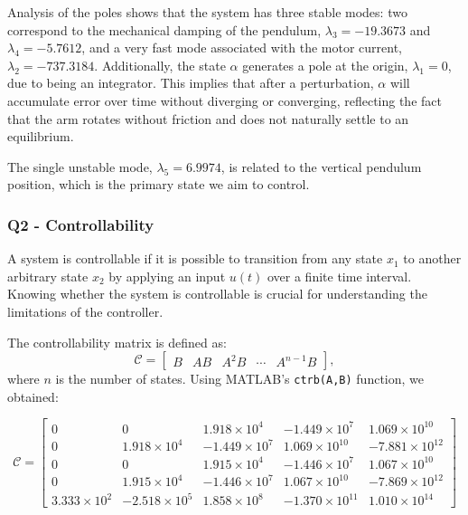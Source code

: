 \par Analysis of the poles shows that the system has three stable modes: two correspond to the mechanical damping of the pendulum, $\lambda_3 = -19.3673$ and $\lambda_4 = -5.7612$, and a very fast mode associated with the motor current, $\lambda_2 = -737.3184$. Additionally, the state $\alpha$ generates a pole at the origin, $\lambda_1 = 0$, due to being an integrator. This implies that after a perturbation, $\alpha$ will accumulate error over time without diverging or converging, reflecting the fact that the arm rotates without friction and does not naturally settle to an equilibrium. 

\par The single unstable mode, $\lambda_5 = 6.9974$, is related to the vertical pendulum position, which is the primary state we aim to control.
\\
\subsubsection{Q2 - Controllability}

\par A system is controllable if it is possible to transition from any state $x_1$ to another arbitrary state $x_2$ by applying an input $u(t)$ over a finite time interval. Knowing whether the system is controllable is crucial for understanding the limitations of the controller.

\par The controllability matrix is defined as:
\begin{equation}
\mathcal{C} = \begin{bmatrix} B & AB & A^2B & \cdots & A^{n-1}B \end{bmatrix},
\end{equation}
where $n$ is the number of states. Using MATLAB's \texttt{ctrb(A,B)} function, we obtained:

\[
\mathcal{C} =
\begin{bmatrix}
0 & 0 & 1.918 \times 10^{4} & -1.449 \times 10^{7} & 1.069 \times 10^{10} \\
0 & 1.918 \times 10^{4} & -1.449 \times 10^{7} & 1.069 \times 10^{10} & -7.881 \times 10^{12} \\
0 & 0 & 1.915 \times 10^{4} & -1.446 \times 10^{7} & 1.067 \times 10^{10} \\
0 & 1.915 \times 10^{4} & -1.446 \times 10^{7} & 1.067 \times 10^{10} & -7.869 \times 10^{12} \\
3.333 \times 10^{2} & -2.518 \times 10^{5} & 1.858 \times 10^{8} & -1.370 \times 10^{11} & 1.010 \times 10^{14}
\end{bmatrix}
\]

